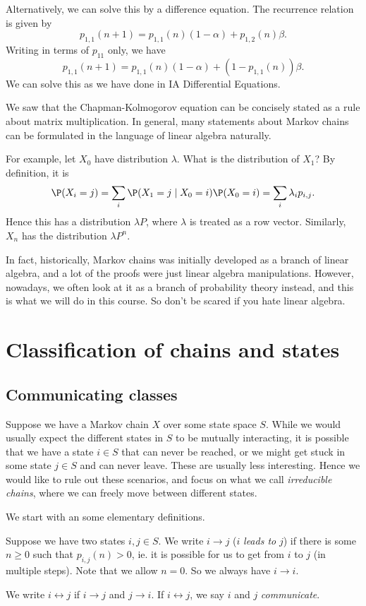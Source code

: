 \documentclass[a4paper]{article}
\begin{document}
\begin{eg}
  Alternatively, we can solve this by a difference equation. The recurrence relation is given by
  \[
    p_{1, 1}(n + 1) = p_{1, 1}(n)(1 - \alpha) + p_{1, 2}(n)\beta.
  \]
  Writing in terms of $p_{11}$ only, we have
  \[
    p_{1, 1}(n + 1) = p_{1, 1}(n)(1 - \alpha) + (1 - p_{1, 1}(n))\beta.
  \]
  We can solve this as we have done in IA Differential Equations.
\end{eg}
We saw that the Chapman-Kolmogorov equation can be concisely stated as a rule about matrix multiplication. In general, many statements about Markov chains can be formulated in the language of linear algebra naturally.

For example, let $X_0$ have distribution $\lambda$. What is the distribution of $X_1$? By definition, it is
\[
  \P(X_i = j) = \sum_i \P(X_1 = j\mid X_0 = i)\P(X_0 = i) = \sum_i \lambda_i p_{i, j}.
\]
Hence this has a distribution $\lambda P$, where $\lambda$ is treated as a row vector. Similarly, $X_n$ has the distribution $\lambda P^n$.

In fact, historically, Markov chains was initially developed as a branch of linear algebra, and a lot of the proofs were just linear algebra manipulations. However, nowadays, we often look at it as a branch of probability theory instead, and this is what we will do in this course. So don't be scared if you hate linear algebra.

\section{Classification of chains and states}
\subsection{Communicating classes}
Suppose we have a Markov chain $X$ over some state space $S$. While we would usually expect the different states in $S$ to be mutually interacting, it is possible that we have a state $i \in S$ that can never be reached, or we might get stuck in some state $j \in S$ and can never leave. These are usually less interesting. Hence we would like to rule out these scenarios, and focus on what we call \emph{irreducible chains}, where we can freely move between different states.

We start with an some elementary definitions.
\begin{defi}
  Suppose we have two states $i, j\in S$. We write $i \to j$ ($i$ \emph{leads to} $j$) if there is some $n \geq 0$ such that $p_{i, j}(n) > 0$, ie. it is possible for us to get from $i$ to $j$ (in multiple steps). Note that we allow $n = 0$. So we always have $i \to i$.

  We write $i \leftrightarrow j$ if $i \to j$ and $j \to i$. If $i \leftrightarrow j$, we say $i$ and $j$ \emph{communicate}.
\end{defi}
\end{document}
